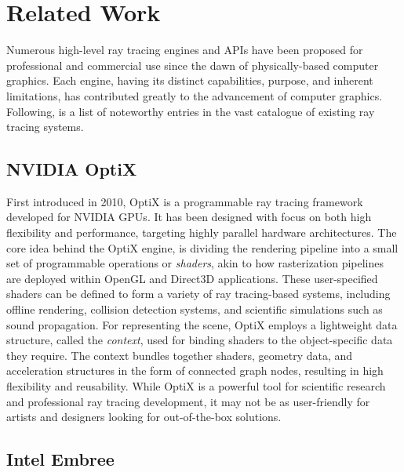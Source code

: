 \section{Related Work}

Numerous high-level ray tracing engines and APIs have been proposed for professional and commercial use since the dawn of physically-based computer graphics.
Each engine, having its distinct capabilities, purpose, and inherent limitations, has contributed greatly to the advancement of computer graphics. 
Following, is a list of noteworthy entries in the vast catalogue of existing ray tracing systems.

\subsection{NVIDIA OptiX}

First introduced in 2010, OptiX \supercite{Parker2010} is a programmable ray tracing framework developed for NVIDIA GPUs.
It has been designed with focus on both high flexibility and performance, targeting highly parallel hardware architectures.
The core idea behind the OptiX engine, is dividing the rendering pipeline into a small set of programmable operations or \textit{shaders}, akin to how rasterization pipelines are deployed within OpenGL and Direct3D applications.
These user-specified shaders can be defined to form a variety of ray tracing-based systems, including offline rendering, collision detection systems, and scientific simulations such as sound propagation.
For representing the scene, OptiX employs a lightweight data structure, called the \textit{context}, used for binding shaders to the object-specific data they require.
The context bundles together shaders, geometry data, and acceleration structures in the form of connected graph nodes, resulting in high flexibility and reusability.
While OptiX is a powerful tool for scientific research and professional ray tracing development, it may not be as user-friendly for artists and designers looking for out-of-the-box solutions.

\subsection{Intel Embree}

